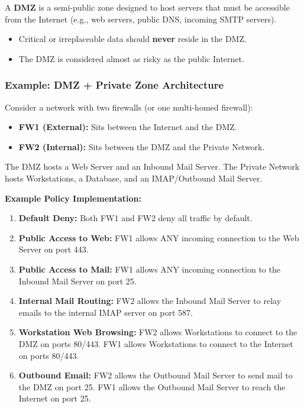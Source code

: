 A \textbf{DMZ} is a semi-public zone designed to host servers that must be accessible from the Internet (e.g., web servers, public DNS, incoming SMTP servers). 

\begin{itemize}
    \item Critical or irreplaceable data should \textbf{never} reside in the DMZ.
    \item The DMZ is considered almost as risky as the public Internet.
\end{itemize}

\subsubsection{Example: DMZ + Private Zone Architecture}

Consider a network with two firewalls (or one multi-homed firewall):
\begin{itemize}
    \item \textbf{FW1 (External):} Sits between the Internet and the DMZ.
    \item \textbf{FW2 (Internal):} Sits between the DMZ and the Private Network.
\end{itemize}

The DMZ hosts a Web Server and an Inbound Mail Server. The Private Network hosts Workstations, a Database, and an IMAP/Outbound Mail Server.

\textbf{Example Policy Implementation:}
\begin{enumerate}
    \item \textbf{Default Deny:} Both FW1 and FW2 deny all traffic by default.
    \item \textbf{Public Access to Web:} FW1 allows ANY incoming connection to the Web Server on port 443.
    \item \textbf{Public Access to Mail:} FW1 allows ANY incoming connection to the Inbound Mail Server on port 25.
    \item \textbf{Internal Mail Routing:} FW2 allows the Inbound Mail Server to relay emails to the internal IMAP server on port 587.
    \item \textbf{Workstation Web Browsing:} FW2 allows Workstations to connect to the DMZ on ports 80/443. FW1 allows Workstations to connect to the Internet on ports 80/443.
    \item \textbf{Outbound Email:} FW2 allows the Outbound Mail Server to send mail to the DMZ on port 25. FW1 allows the Outbound Mail Server to reach the Internet on port 25.
\end{enumerate}

